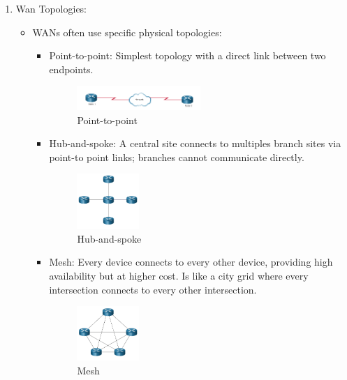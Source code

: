 \documentclass[a4paper,11pt]{article}
\begin{document}
\begin{enumerate}
    \item Wan Topologies:\\
    \begin{itemize}
        \item WANs often use specific physical topologies:\\
        \begin{itemize}
            \item Point-to-point: Simplest topology with a direct link between two endpoints.\\

    \begin{figure}[h!]
    \centering
    \includegraphics[width=0.5\textwidth]{26.png}
    \caption{Point-to-point}
    \label{fig:cap1}
    \end{figure}
\newpage
            \item Hub-and-spoke: A central site connects to multiples branch sites via point-to point links; branches cannot communicate directly.\\
    \begin{figure}[h!]
    \centering
    \includegraphics[width=0.25\textwidth]{24.png}
    \caption{Hub-and-spoke}
    \label{fig:cap1}
    \end{figure}
            \item Mesh: Every device connects to every other device, providing high availability but at higher cost. Is like a city grid where every intersection connects to every other intersection.\\
    \begin{figure}[h!]
    \centering
    \includegraphics[width=0.25\textwidth]{25.png}
    \caption{Mesh}
    \label{fig:cap1}

\end{figure}
\end{itemize}
\end{itemize}
\end{enumerate}
\end{document}
